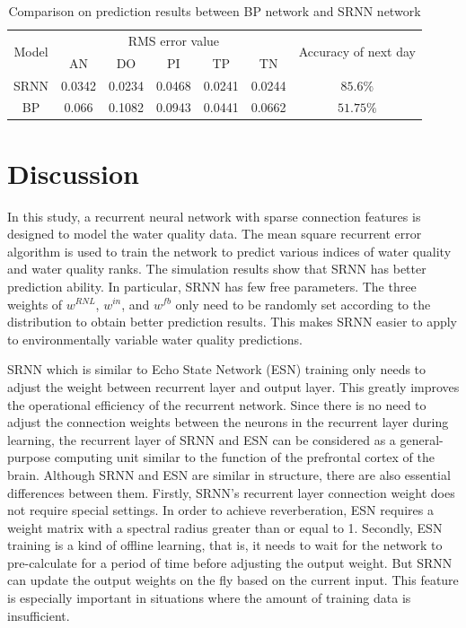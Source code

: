 \documentclass[runningheads]{llncs}
\begin{document}
\begin{table}[htbp] 
\centering
\caption{Comparison on prediction results between BP network and SRNN network}
\label{Comparison on prediction results between BP network and SRNN network}
\begin{tabular}{ccccccc} 
\toprule 
\multirow{2}{*}{Model}&\multicolumn{5}{c}{RMS error value}&\multirow{2}{4.25cm}{Accuracy of next day}\\
\cline{2-6}
&AN &DO&PI&TP&TN&\\
\midrule 
SRNN&0.0342&0.0234&0.0468&0.0241&0.0244&$85.6\%$\\
BP&0.066&0.1082&0.0943&0.0441&0.0662&$51.75\%$\\
\bottomrule 
\end{tabular} 
\end{table}

\section{Discussion}
In this study, a recurrent neural network with sparse connection features is 
designed to model the water quality data. The mean square recurrent error algorithm 
is used to train the network to predict various indices of water quality 
and water quality ranks. The simulation results show that SRNN has better 
prediction ability. In particular, SRNN has few free parameters. The three 
weights of $w^{RNL}$, $w^{in}$, and $w^{fb}$ only need to be randomly set 
according to the distribution to obtain better prediction results.
This makes SRNN easier to apply to environmentally variable water 
quality predictions.

SRNN which is similar to Echo State Network (ESN) training only needs 
to adjust the weight between recurrent layer and output layer. 
This greatly improves the operational efficiency of the recurrent network. 
Since there is no need to adjust the connection weights between the neurons 
in the recurrent layer during learning, the recurrent layer of SRNN 
and ESN can be considered as a general-purpose computing unit similar
to the function of the prefrontal cortex of the brain\cite{RN20,RN21}. 
Although SRNN and ESN are similar in structure, there are also essential 
differences between them. Firstly, SRNN's recurrent layer connection 
weight does not require special settings. In order to achieve 
reverberation, ESN requires a weight matrix with a spectral radius 
greater than or equal to 1. Secondly, ESN training is a kind of 
offline learning, that is, it needs to wait for the network to 
pre-calculate for a period of time before adjusting the output 
weight. But SRNN can update the output weights on the fly based 
on the current input. This feature is especially important 
in situations where the amount of training data is insufficient. 
\end{document}
